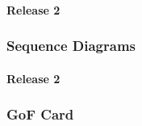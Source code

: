 \paragraph{Release 2}

\begin{center}
\end{center}

\subsubsection{Sequence Diagrams}

\paragraph{Release 2}

\begin{center}
\end{center}

\subsubsection{GoF Card}

